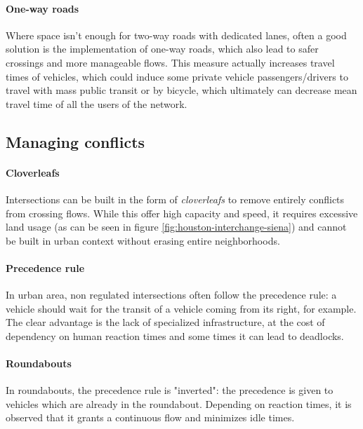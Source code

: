 \paragraph{One-way roads}

Where space isn't enough for two-way roads with dedicated lanes, often a good solution is the implementation of one-way roads, which also lead to safer crossings and more manageable flows. This measure actually increases travel times of vehicles, which could induce some private vehicle passengers/drivers to travel with mass public transit or by bicycle, which ultimately can decrease mean travel time of all the users of the network.

\subsection{Managing conflicts}

\paragraph{Cloverleafs}

Intersections can be built in the form of \textit{cloverleafs} to remove entirely conflicts from crossing flows. While this offer high capacity and speed, it requires excessive land usage (as can be seen in figure \ref{fig:houston-interchange-siena}) and cannot be built in urban context without erasing entire neighborhoods.

\paragraph{Precedence rule}

In urban area, non regulated intersections often follow the precedence rule: a vehicle should wait for the transit of a vehicle coming from its right, for example. The clear advantage is the lack of specialized infrastructure, at the cost of dependency on human reaction times and some times it can lead to deadlocks.

\paragraph{Roundabouts}

In roundabouts, the precedence rule is "inverted": the precedence is given to vehicles which are already in the roundabout. Depending on reaction times, it is observed that it grants a continuous flow and minimizes idle times.

